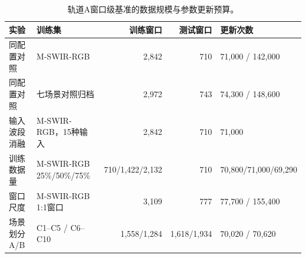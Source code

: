 \documentclass[UTF8,a4paper,10pt]{ctexart}
\begin{document}
\begin{table}[htbp]\centering\small
\caption{轨道A窗口级基准的数据规模与参数更新预算。}\label{tab:s-bench-protocol-zh}
\vspace{1pt}{\footnotesize\noindent 除“窗口尺度”一行外均使用4:1窗口；对照归档使用现成图块。更新次数为每轮实际批次数与epoch数之积。\par}
\begin{tabular}{@{}llrrl@{}}\toprule
实验 & 训练集 & 训练窗口 & 测试窗口 & 更新次数\\\midrule
同配置对照 & M-SWIR-RGB & 2{,}842 & 710 & 71{,}000 / 142{,}000\\
同配置对照 & 七场景对照归档\cite{chen2026thesis} & 2{,}972 & 743 & 74{,}300 / 148{,}600\\
输入波段消融 & M-SWIR-RGB，15种输入 & 2{,}842 & 710 & 71{,}000\\
训练数据量 & M-SWIR-RGB 25\%/50\%/75\% & 710/1{,}422/2{,}132 & 710 & 70{,}800/71{,}000/69{,}290\\
窗口尺度 & M-SWIR-RGB 1:1窗口 & 3{,}109 & 777 & 77{,}700 / 155{,}400\\
场景划分A/B & C1--C5 / C6--C10 & 1{,}558/1{,}284 & 1{,}618/1{,}934 & 70{,}020 / 70{,}620\\\bottomrule
\end{tabular}\end{table}

\begin{table}[htbp]\centering\small
\caption{M-SWIR-RGB逐场景的同配置窗口级结果（100 epoch）。}\label{tab:s-bench-scene-seeds-zh}
\vspace{1pt}{\footnotesize\noindent 测试窗口算术平均；PSNR列给出三次独立训练的均值$\pm$样本标准差。\par}

\end{table}

\begin{table}[htbp]\centering\small
\caption{同4:1数据与划分下的三类生成架构对比（200 epoch，256整块输入）。}\label{tab:s-three-model-zh}
\vspace{1pt}{\footnotesize\noindent 固定训练种子11，批大小为唯一变量。\par}

\end{table}

\begin{table}[htbp]\centering\small
\caption{轨道A输入波段消融（100 epoch，4:1随机窗口划分）。}\label{tab:s-bench-band-zh}
\vspace{1pt}{\footnotesize\noindent 单波段复制为三通道，三波段按波段号升序堆叠。$\Delta$PSNR为相对B123三次平均的逐窗口差值均值，括号内为按场景整群bootstrap的95\%置信区间。\par}

\end{table}
\end{document}
